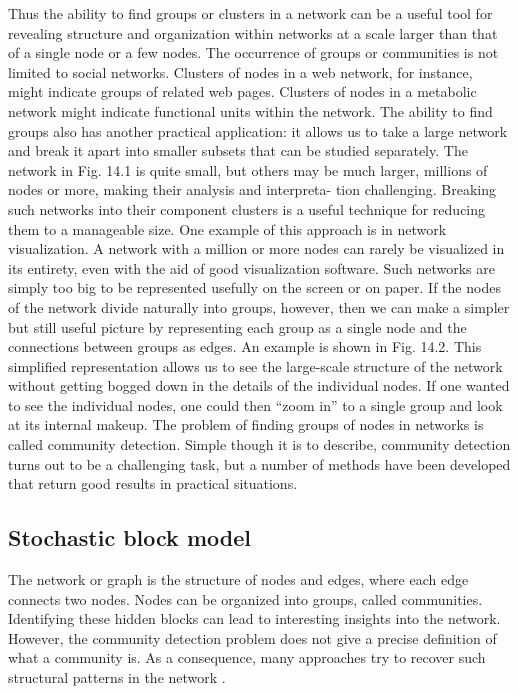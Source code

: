 Thus the ability to find groups or clusters in a network can be a useful tool for revealing structure and organization within networks at a scale larger than that of a single node or a
few nodes. The occurrence of groups or communities is not limited to social networks.
Clusters of nodes in a web network, for instance, might indicate groups of
related web pages. Clusters of nodes in a metabolic network might indicate
functional units within the network. The ability to find groups also has another practical application: it allows
us to take a large network and break it apart into smaller subsets that can be
studied separately. The network in Fig. 14.1 is quite small, but others may be
much larger, millions of nodes or more, making their analysis and interpreta-
tion challenging. Breaking such networks into their component clusters is a
useful technique for reducing them to a manageable size. One example of this
approach is in network visualization. A network with a million or more nodes
can rarely be visualized in its entirety, even with the aid of good visualization
software. Such networks are simply too big to be represented usefully on the
screen or on paper. If the nodes of the network divide naturally into groups,
however, then we can make a simpler but still useful picture by representing
each group as a single node and the connections between groups as edges.
An example is shown in Fig. 14.2. This simplified representation allows us to
see the large-scale structure of the network without getting bogged down in
the details of the individual nodes. If one wanted to see the individual nodes,
one could then “zoom in” to a single group and look at its internal makeup. The problem of finding groups of nodes in networks is called community
detection. Simple though it is to describe, community detection turns out to be
a challenging task, but a number of methods have been developed that return
good results in practical situations.

\subsection{Stochastic block model}
The network or graph is the structure of nodes and edges, where each edge connects two nodes. Nodes can be organized into groups, called communities. Identifying these hidden blocks can lead to interesting insights into the network. However, the community detection problem does not give a precise definition of what a community is. As a consequence, many approaches try to recover such structural patterns in the network \cite{martin}.

